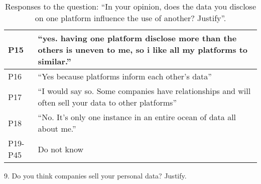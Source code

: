 \begin{table}[H]
\begin{longtable}{p{3cm} p{13cm}}
        \hline
        P15 & ``yes. having one platform disclose more than the others is uneven to me, so i like all my platforms to similar.'' \\
        \hline
        P16 & ``Yes because platforms inform each other's data'' \\
        \hline
        P17 & ``I would say so. Some companies have relationships and will often sell your data to other platforms'' \\
        \hline
        P18 & ``No. It's only one instance in an entire ocean of data all about me.'' \\
        \hline
        P19-P45 & Do not know \\
        \hline
    \end{longtable}
    \vspace{1em}
    \caption{Responses to the question: ``In your opinion, does the data you disclose on one platform influence the use of another? Justify''.}
    \label{table:survey_s5_q8}
\end{table}

9. Do you think companies sell your personal data? Justify.

